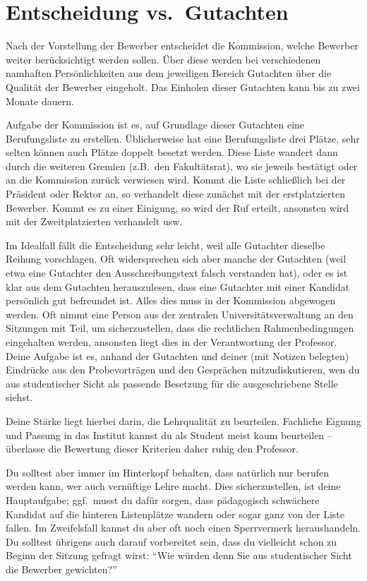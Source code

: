 \section{Entscheidung vs.\ Gutachten}
Nach der Vorstellung der Bewerber entscheidet die Kommission, welche Bewerber weiter berücksichtigt werden sollen. Über diese werden bei verschiedenen namhaften Persönlichkeiten aus dem jeweiligen Bereich Gutachten über die Qualität der Bewerber eingeholt. Das Einholen dieser Gutachten kann bis zu zwei Monate dauern.

Aufgabe der Kommission ist es, auf Grundlage dieser Gutachten eine Berufungsliste zu erstellen. Üblicherweise hat eine Berufungsliste drei Plätze, sehr selten können auch Plätze doppelt besetzt werden. Diese Liste wandert dann durch die weiteren Gremien (z.B.\ den Fakultätsrat), wo sie jeweils bestätigt oder an die Kommission zurück verwiesen wird. Kommt die Liste schließlich bei der Präsident oder Rektor an, so verhandelt diese zunächst mit der erstplatzierten Bewerber. Kommt es zu einer Einigung, so wird der Ruf erteilt, ansonsten wird mit der Zweitplatzierten verhandelt usw.

Im Idealfall fällt die Entscheidung sehr leicht, weil alle Gutachter dieselbe Reihung vorschlagen. Oft widersprechen sich aber manche der Gutachten (weil etwa eine Gutachter den Ausschreibungstext falsch verstanden hat), oder es ist klar aus dem Gutachten herauszulesen, dass eine Gutachter mit einer Kandidat persönlich gut befreundet ist. Alles dies muss in der Kommission abgewogen werden. Oft nimmt eine Person aus der zentralen Universitätsverwaltung an den Sitzungen mit Teil, um sicherzustellen, dass die rechtlichen Rahmenbedingungen eingehalten werden, ansonsten liegt dies in der Verantwortung der Professor. Deine Aufgabe ist es, anhand der Gutachten und deiner (mit Notizen belegten) Eindrücke aus den Probevorträgen und den Gesprächen mitzudiskutieren, wen du aus studentischer Sicht als passende Besetzung für die ausgeschriebene Stelle siehst.

Deine Stärke liegt hierbei darin, die Lehrqualität zu beurteilen. Fachliche Eignung und Passung in das Institut kannst du als Student meist kaum beurteilen -- überlasse die Bewertung dieser Kriterien daher ruhig den Professor.

Du solltest aber immer im Hinterkopf behalten, dass natürlich nur berufen werden kann, wer auch vernüftige Lehre macht. Dies sicherzustellen, ist deine Hauptaufgabe; ggf.\ musst du dafür sorgen, dass pädagogisch schwächere Kandidat auf die hinteren Listenplätze wandern oder sogar ganz von der Liste fallen. Im Zweifelsfall kannst du aber oft noch einen Sperrvermerk heraushandeln. Du solltest übrigens auch darauf vorbereitet sein, dass du vielleicht schon zu Beginn der Sitzung gefragt wirst: \enquote{Wie würden denn Sie aus studentischer Sicht die Bewerber gewichten?}


